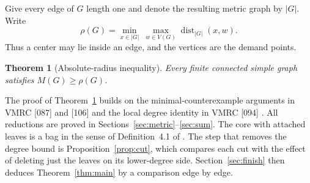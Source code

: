 \documentclass[11pt,a4paper]{article}
\newtheorem{theorem}{Theorem}[section]
\newcommand{\dist}{\operatorname{dist}}
\begin{document}
Give every edge of $G$ length one and denote the resulting metric graph
by $|G|$. Write
\[
 \rho(G)=\min_{x\in|G|}\ \max_{w\in V(G)}\dist_{|G|}(x,w).
\]
Thus a center may lie inside an edge, and the vertices are the demand points.
\begin{theorem}[Absolute-radius inequality]\label{thm:abs}
Every finite connected simple graph satisfies $M(G)\ge\rho(G)$.
\end{theorem}
The proof of Theorem~\ref{thm:abs} builds on the minimal-counterexample
arguments in VMRC [087] and [106] and the local degree identity in
VMRC [094] \cite{VMRC}. All reductions are proved in
Sections~\ref{sec:metric}--\ref{sec:sum}. The core with attached leaves
is a bag in the sense of Definition~4.1 of \cite{CPS}. The step that
removes the degree
bound is Proposition~\ref{prop:cut}, which compares each cut with the effect
of deleting just the leaves on its lower-degree side. Section~\ref{sec:finish}
then deduces Theorem~\ref{thm:main} by a comparison edge by edge.
\end{document}
